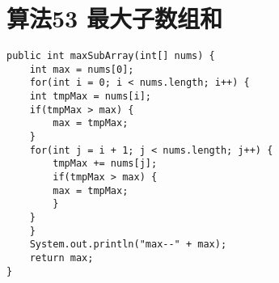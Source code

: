 \documentclass[11pt]{article}
\author{myu}
\date{\today}
\title{}
\begin{document}
\tableofcontents


\section{算法53 最大子数组和}
\label{sec:org96fde17}
\begin{verbatim}
public int maxSubArray(int[] nums) {
    int max = nums[0];
    for(int i = 0; i < nums.length; i++) {
	int tmpMax = nums[i];
	if(tmpMax > max) {
	    max = tmpMax;
	}
	for(int j = i + 1; j < nums.length; j++) {
	    tmpMax += nums[j];
	    if(tmpMax > max) {
		max = tmpMax;
	    }
	}
    }
    System.out.println("max--" + max);
    return max;
}
\end{verbatim}
\end{document}
